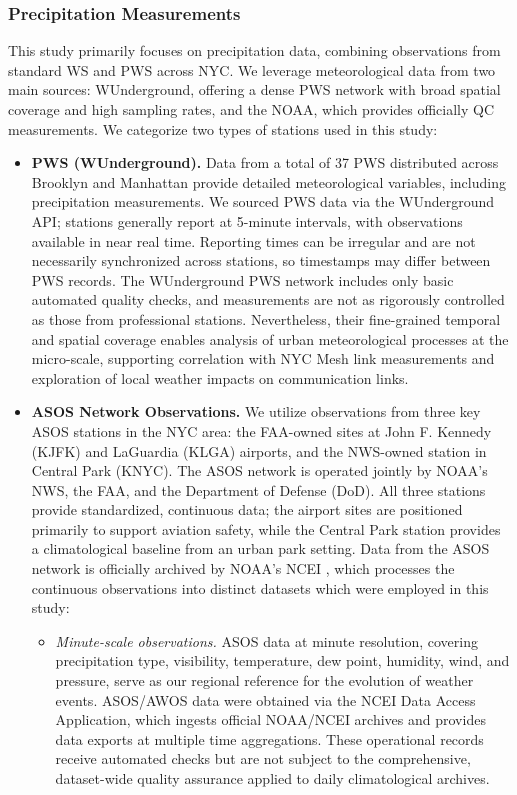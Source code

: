 \documentclass[manuscript]{copernicus}
\begin{document}
\subsubsection{Precipitation Measurements}
This study primarily focuses on precipitation data, combining observations from standard WS and PWS across NYC. We leverage meteorological data from two main sources: WUnderground, offering a dense PWS network with broad spatial coverage and high sampling rates, and the NOAA, which provides officially QC measurements.
We categorize two types of stations used in this study:
\begin{itemize}
\item \textbf{PWS (WUnderground).}
Data from a total of 37 PWS distributed across Brooklyn and Manhattan provide detailed 
meteorological variables, including precipitation measurements. 
We sourced PWS data via the WUnderground API; stations generally report at 5-minute intervals, with observations available in near real time. Reporting times can be irregular and are not necessarily synchronized across stations, so timestamps may differ between PWS records. The WUnderground PWS network includes only basic automated quality checks, and measurements are not as rigorously controlled as those from professional stations.
Nevertheless, their fine-grained temporal and spatial coverage enables analysis of urban meteorological processes at the micro-scale, supporting correlation with NYC Mesh link measurements and exploration of local weather impacts on communication links.

\item  \textbf{ASOS Network Observations.}
We utilize observations from three key ASOS stations in the NYC area: the FAA-owned sites at John F. Kennedy (KJFK) and LaGuardia (KLGA) airports, and the NWS-owned station in Central Park (KNYC). The ASOS network is operated jointly by NOAA's NWS, the FAA, and the Department of Defense (DoD). All three stations provide standardized, continuous data; the airport sites are positioned primarily to support aviation safety, while the Central Park station provides a climatological baseline from an urban park setting. 
Data from the ASOS network is officially archived by NOAA's NCEI \citep{NOAA2005Asos5Min}, which processes the continuous observations into distinct datasets which were employed in this study:
\begin{itemize}
\item \emph{Minute-scale observations.} 
ASOS data at minute resolution, covering precipitation type, visibility, temperature, dew point, humidity, wind, and pressure, serve as our regional reference for the evolution of weather events.  ASOS/AWOS data were obtained via the NCEI Data Access Application, which ingests official NOAA/NCEI archives and provides data exports at multiple time aggregations.
These operational records receive automated checks but are not subject to the comprehensive, dataset-wide quality assurance applied to daily climatological archives.


\end{itemize}
\end{itemize}
\end{document}
